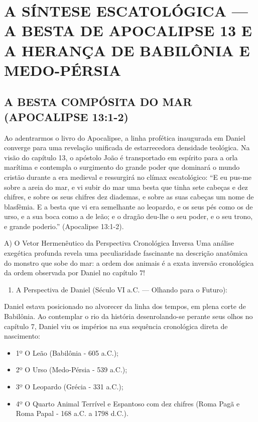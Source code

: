 \documentclass[11pt,a4paper,openany]{book}
\begin{document}
\section{A SÍNTESE ESCATOLÓGICA — A BESTA DE APOCALIPSE 13 E A HERANÇA DE BABILÔNIA E MEDO-PÉRSIA}



\subsection{A BESTA COMPÓSITA DO MAR (APOCALIPSE 13:1-2)}


Ao adentrarmos o livro do Apocalipse, a linha profética inaugurada em Daniel converge para uma revelação unificada de estarrecedora densidade teológica. Na visão do capítulo 13, o apóstolo João é transportado em espírito para a orla marítima e contempla o surgimento do grande poder que dominará o mundo cristão durante a era medieval e ressurgirá no clímax escatológico:
``E eu pus-me sobre a areia do mar, e vi subir do mar uma besta que tinha sete cabeças e dez chifres, e sobre os seus chifres dez diademas, e sobre as suas cabeças um nome de blasfêmia. E a besta que vi era semelhante ao leopardo, e os seus pés como os de urso, e a sua boca como a de leão; e o dragão deu-lhe o seu poder, e o seu trono, e grande poderio.'' (Apocalipse 13:1-2).

A) O Vetor Hermenêutico da Perspectiva Cronológica Inversa
Uma análise exegética profunda revela uma peculiaridade fascinante na descrição anatômica do monstro que sobe do mar: a ordem dos animais é a exata inversão cronológica da ordem observada por Daniel no capítulo 7!

\begin{enumerate}
  \item A Perspectiva de Daniel (Século VI a.C. — Olhando para o Futuro):
\end{enumerate}

Daniel estava posicionado no alvorecer da linha dos tempos, em plena corte de Babilônia. Ao contemplar o rio da história desenrolando-se perante seus olhos no capítulo 7, Daniel viu os impérios na sua sequência cronológica direta de nascimento:
\begin{itemize}
  \item 1º O Leão (Babilônia - 605 a.C.);
  \item 2º O Urso (Medo-Pérsia - 539 a.C.);
  \item 3º O Leopardo (Grécia - 331 a.C.);
  \item 4º O Quarto Animal Terrível e Espantoso com dez chifres (Roma Pagã e Roma Papal - 168 a.C. a 1798 d.C.).
\end{itemize}
\end{document}
